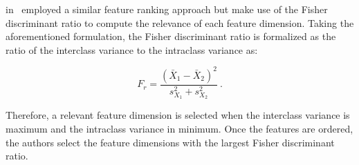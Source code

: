 \citeauthor{Vos2012} in~\cite{Vos2012} employed a similar feature ranking approach but make use of the Fisher discriminant ratio to compute the relevance of each feature dimension.
Taking the aforementioned formulation, the Fisher discriminant ratio is formalized as the ratio of the interclass variance to the intraclass variance as:

\begin{equation}
F_r = \frac{(\bar{X}_1 - \bar{X}_2)^2}{s^{2}_{X_1}+s^{2}_{X_2}} \ .
\label{eq:fisherratio}
\end{equation}

Therefore, a relevant feature dimension is selected when the interclass variance is maximum and the intraclass variance in minimum.
Once the features are ordered, the authors select the feature dimensions with the largest Fisher discriminant ratio.

